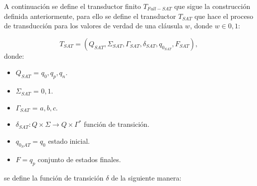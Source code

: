 \documentclass{book}
\begin{document}
A continuación se define el transductor finito $T_{Full-SAT}$ que sigue la construcción definida anteriormente, para ello se define
el transductor $T_{SAT}$ que hace el proceso de transducción para los valores de verdad de una cláusula $w$, donde $w\in {0,1}$:

\[
    T_{SAT} = (Q_{SAT}, {\Sigma}_{SAT}, \Gamma_{SAT}, \delta_{SAT}, q_{0_{SAT}}, F_{SAT}),
\]
donde:
\begin{itemize}
    \item \(Q_{SAT}\) = ${q_0,q_p,q_n}$.
    \item \(\Sigma_{SAT}\) = ${0,1}$.
    \item \(\Gamma_{SAT}\) = ${a,b,c}$.
    \item \(\delta_{SAT}: Q \times \Sigma \to Q \times \Gamma^*\) función de transición.
    \item \(q_{0_SAT} = q_0\) estado inicial.
    \item \(F={q_p}\) conjunto de estados finales.
\end{itemize}
se define la función de transición $\delta$ de la siguiente manera:
\end{document}
